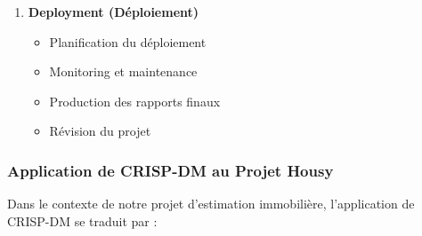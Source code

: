 \begin{enumerate}
    \item \textbf{Deployment (Déploiement)}
    \begin{itemize}
        \item Planification du déploiement
        \item Monitoring et maintenance
        \item Production des rapports finaux
        \item Révision du projet
    \end{itemize}
\end{enumerate}

\subsubsection{Application de CRISP-DM au Projet Housy}

Dans le contexte de notre projet d'estimation immobilière, l'application de CRISP-DM se traduit par :

